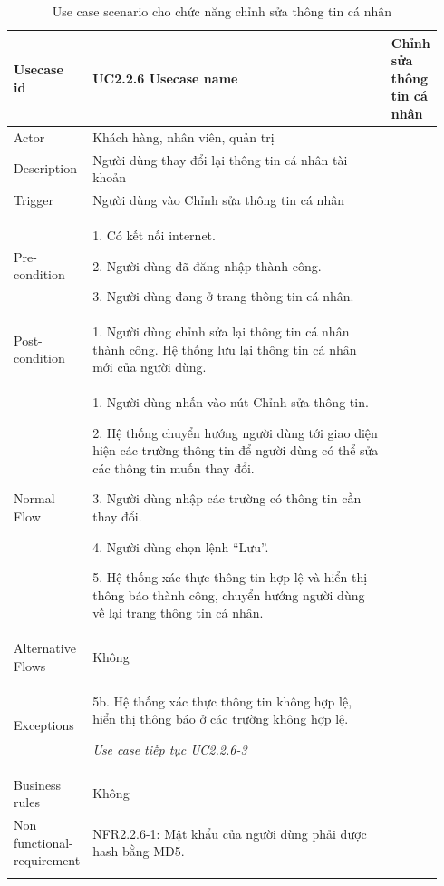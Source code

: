

\begin{longtable}{|>{\hspace{0pt}}m{0.175\linewidth}|>{\hspace{0pt}}m{0.767\linewidth}|} 
\hline
Usecase id & UC2.2.6 \endfirsthead 
\hline
Usecase name & Chỉnh sửa thông tin cá nhân \\ 
\hline
Actor & Khách hàng, nhân viên, quản trị \\ 
\hline
Description & Người dùng thay đổi lại thông tin cá nhân tài khoản \\ 
\hline
Trigger & Người dùng vào Chỉnh sửa thông tin cá nhân \\ 
\hline
Pre-condition & 1. Có kết nối internet.\par{}2. Người dùng đã đăng nhập thành công.\par{}3. Người dùng đang ở trang thông tin cá nhân. \\ 
\hline
Post-condition & 1. Người dùng chỉnh sửa lại thông tin cá nhân thành công. Hệ thống lưu lại thông tin cá nhân mới của người dùng. \\ 
\hline
Normal Flow & 1. Người dùng nhấn vào nút Chỉnh sửa thông tin.\par{}2. Hệ thống chuyển hướng người dùng tới giao diện hiện các trường thông tin để người dùng có thể sửa các thông tin muốn thay đổi.\par{}3. Người dùng nhập các trường có thông tin cần thay đổi.\par{}4. Người dùng chọn lệnh “Lưu”.\par{}5. Hệ thống xác thực thông tin hợp lệ và hiển thị thông báo thành công, chuyển hướng người dùng về lại trang thông tin cá nhân. \\ 
\hline
Alternative Flows & Không \\ 
\hline
Exceptions & 5b. Hệ thống xác thực thông tin không hợp lệ, hiển thị thông báo ở các trường không hợp lệ.\par{}\textit{Use case tiếp tục UC2.2.6-3} \\ 
\hline
Business rules & Không \\ 
\hline
Non functional-requirement & NFR2.2.6-1: Mật khẩu của người dùng phải được hash bằng MD5. \\ 
\hline
\caption{Use case scenario cho chức năng chỉnh sửa thông tin cá nhân}
\end{longtable}


